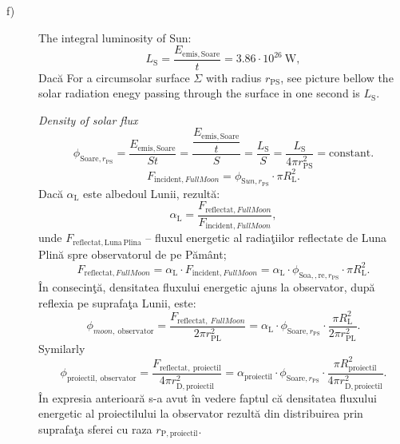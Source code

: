 \begin{description}
\item[f)] The integral luminosity of Sun:
  \[
    L_{\mathrm{S}} = \frac{E_{\mathrm{emis,Soare}}}{t}
      = 3.86\cdot10^{26}\ \mathrm{W},
  \]
  Dac\u{a} For a circumsolar surface $\Sigma$ with radius %
  $r_{\mathrm{PS}}$, see picture bellow the solar radiation enegy passing %
  through the surface in one second is $L_{\mathrm{S}}$.


  \textit{Density of solar flux}
  \[
    \phi_{\mathrm{Soare},r_{\mathrm{PS}}}
      = \frac{E_{\mathrm{emis,Soare}}}{St}
      = \frac{\dfrac{E_{\mathrm{emis,Soare}}}{t}}{S}
      = \frac{L_{\mathrm{S}}}{S}
      = \frac{L_{\mathrm{S}}}{4\pi r_{\mathrm{PS}}^2}
      = \text{constant}.
  \]
  \[
    F_{\mathrm{incident},FullMoon}
      = \phi_{\mathrm{S}un,r_{\mathrm{PS}}}\cdot\pi R_{\mathrm{L}}^2.
  \]
  Dac\u{a} $\alpha_{\mathrm{L}}$ este albedoul Lunii, rezult\u{a}: %
  \[
    \alpha_{\mathrm{L}} = \frac{F_{\mathrm{reflectat},FullMoon}}
      {F_{\mathrm{incident},FullMoon}},
  \]
  unde $F_{\mathrm{reflectat,Luna\,Plina}}$ -- fluxul energetic al
  radia\c{t}iilor reflectate de Luna Plin\u{a} spre observatorul de pe
  P\u{a}m\^ant;
  \[
    F_{\mathrm{reflectat},FullMoon}
      = \alpha_{\mathrm{L}}\cdot F_{\mathrm{incident},FullMoon}
      = \alpha_{\mathrm{L}}\cdot
        \phi_{\mathrm{Soa,,re},r_{\mathrm{PS}}}\cdot %
        \pi R_{\mathrm{L}}^2.
  \]
  \^In consecin\c{t}\u{a}, densitatea fluxului energetic ajuns la observator,
  dup\u{a} reflexia pe suprafa\c{t}a Lunii, este:
  \[
    \phi_{moon,\ \mathrm{observator}}
      = \frac{F_{\mathrm{reflectat},\ FullMoon}}{2\pi r_{\mathrm{PL}}^2}
      = \alpha_{\mathrm{L}}\cdot\phi_{\mathrm{Soare},r_{\mathrm{PS}}}\cdot
        \frac{\pi R_{\mathrm{L}}^2}{2\pi r_{\mathrm{PL}}^2}.
  \]
  Symilarly %
  \[
    \phi_{\mathrm{proiectil,\ observator}}
      = \frac{F_{\mathrm{reflectat,\ proiectil}}}
        {4\pi r_{\mathrm{D,proiectil}}^2}
      = \alpha_{\mathrm{proiectil}}\cdot
        \phi_{\mathrm{Soare},r_{\mathrm{PS}}}\cdot
        \frac{\pi R_{\mathrm{proiectil}}^2}{4\pi r_{\mathrm{D,proiectil}}^2}.
  \]
  \^In expresia anterioar\u{a} s-a avut \^in vedere faptul c\u{a} densitatea
  fluxului energetic al proiectilului la observator rezult\u{a} din
  distribuirea prin suprafa\c{t}a sferei cu raza $r_{\mathrm{P,proiectil}}$.


\end{description}
